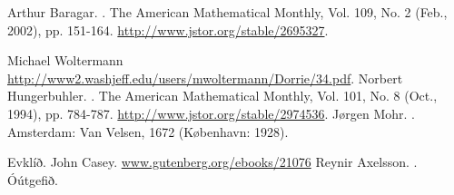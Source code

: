 \begin{frame}[allowframebreaks]
\begin{thebibliography}{10}
  \beamertemplatearticlebibitems
     Arthur Baragar.
     .
      \newblock The American Mathematical Monthly, Vol. 109, No. 2 (Feb., 2002), pp. 151-164.
      \newblock  \url{http://www.jstor.org/stable/2695327}.

      Michael Woltermann
      \newblock  \url{http://www2.washjeff.edu/users/mwoltermann/Dorrie/34.pdf}.
      Norbert Hungerbuhler.
      .
      \newblock The American Mathematical Monthly, Vol. 101, No. 8 (Oct., 1994), pp. 784-787.
      \newblock \url{http://www.jstor.org/stable/2974536}.
  \beamertemplatebookbibitems
{}
  Jørgen Mohr.
  .
  \newblock Amsterdam: Van Velsen, 1672 (København: 1928).
  
  Evklíð.
  \newblock John Casey.
  \newblock \url{www.gutenberg.org/ebooks/21076}
  Reynir Axelsson.
  .
  \newblock Óútgefið.
  \end{thebibliography}
\end{frame}


